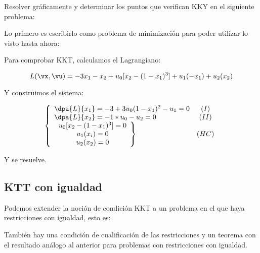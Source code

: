 \begin{example}

Resolver gráficamente y determinar los puntos que verifican KKY en el siguiente problema:

\begin{ioprob}
\end{ioprob}

Lo primero es escribirlo como problema de minimización para poder utilizar lo visto hasta ahora:

\begin{ioprob}
\end{ioprob}

Para comprobar KKT, calculamos el Lagrangiano:

\[
	L(\vx,\vu) = -3x_1 - x_2 + u_0[x_2-(1-x_1)^3] + u_1(-x_1) + u_2(x_2)
\]

Y construimos el sistema:

\[
	\left\{
	\begin{array}{lc}
		\dpa{L}{x_1} = -3 + 3u_0(1-x_1)^2 - u_1 = 0&(I)\\
		\dpa{L}{x_2} = -1 * u_0 - u_2 = 0 & (II)\\
		\left. 
			\begin{array}{c}
				u_0[x_2-(1-x_1)^3] = 0\\
				u_1(x_i) = 0\\
				u_2(x_2) = 0
			\end{array}
			\right\} &(HC)
	\end{array}
	\right.
\]

Y se resuelve.

\end{example}


\subsection{KTT con igualdad}

Podemos extender la noción de condición KKT a un problema en el que haya restricciones con igualdad, esto es:

\marginpar{\textcolor{yellow}{Completar de .tex del profesor}}



También hay una condición de cualificación de las restricciones y un teorema con el resultado análogo al anterior para problemas con restricciones con igualdad.


